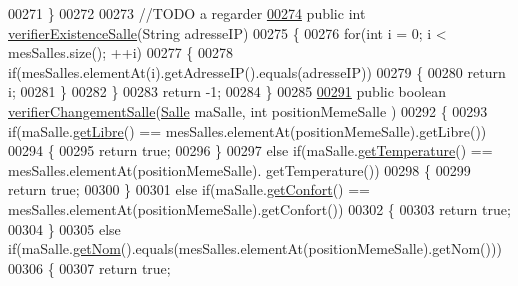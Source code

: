 \begin{DoxyCode}
00271     \}
00272 
00273     \textcolor{comment}{//TODO a regarder}
\hyperlink{classcom_1_1lasalle_1_1meeting_1_1_main_activity_ac505af5465f0d95b1232acb745c86a08}{00274}     \textcolor{keyword}{public} \textcolor{keywordtype}{int} \hyperlink{classcom_1_1lasalle_1_1meeting_1_1_main_activity_ac505af5465f0d95b1232acb745c86a08}{verifierExistenceSalle}(String adresseIP)
00275     \{
00276         \textcolor{keywordflow}{for}(\textcolor{keywordtype}{int} i = 0; i < mesSalles.size(); ++i)
00277         \{
00278             \textcolor{keywordflow}{if}(mesSalles.elementAt(i).getAdresseIP().equals(adresseIP))
00279             \{
00280                 \textcolor{keywordflow}{return} i;
00281             \}
00282         \}
00283         \textcolor{keywordflow}{return} -1;
00284     \}
00285 
\hyperlink{classcom_1_1lasalle_1_1meeting_1_1_main_activity_a1502e68ede2683ced61843887ca63963}{00291}     \textcolor{keyword}{public} \textcolor{keywordtype}{boolean} \hyperlink{classcom_1_1lasalle_1_1meeting_1_1_main_activity_a1502e68ede2683ced61843887ca63963}{verifierChangementSalle}(\hyperlink{classcom_1_1lasalle_1_1meeting_1_1_salle}{Salle} maSalle, \textcolor{keywordtype}{int} positionMemeSalle
      )
00292     \{
00293         \textcolor{keywordflow}{if}(maSalle.\hyperlink{classcom_1_1lasalle_1_1meeting_1_1_salle_adc0c4936355bc0ae22991f69c12a5e42}{getLibre}() == mesSalles.elementAt(positionMemeSalle).getLibre())
00294         \{
00295             \textcolor{keywordflow}{return} \textcolor{keyword}{true};
00296         \}
00297         \textcolor{keywordflow}{else} \textcolor{keywordflow}{if}(maSalle.\hyperlink{classcom_1_1lasalle_1_1meeting_1_1_salle_ae3235f548f8bc7ab4d05ff38ec762e77}{getTemperature}() == mesSalles.elementAt(positionMemeSalle).
      getTemperature())
00298         \{
00299             \textcolor{keywordflow}{return} \textcolor{keyword}{true};
00300         \}
00301         \textcolor{keywordflow}{else} \textcolor{keywordflow}{if}(maSalle.\hyperlink{classcom_1_1lasalle_1_1meeting_1_1_salle_a8f29b7c1302251eed004d0828b7b2ab8}{getConfort}() == mesSalles.elementAt(positionMemeSalle).getConfort())
00302         \{
00303             \textcolor{keywordflow}{return} \textcolor{keyword}{true};
00304         \}
00305         \textcolor{keywordflow}{else} \textcolor{keywordflow}{if}(maSalle.\hyperlink{classcom_1_1lasalle_1_1meeting_1_1_salle_a49d977f69b2783e8ad57eccffc29e97b}{getNom}().equals(mesSalles.elementAt(positionMemeSalle).getNom()))
00306         \{
00307             \textcolor{keywordflow}{return} \textcolor{keyword}{true};

\end{DoxyCode}
